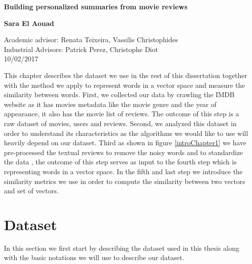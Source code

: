 \documentclass{article}
\begin{document}
\begin{titlepage}
    \begin{center}
        \vspace*{1cm}
        
        \textbf{Building personalized summaries from movie reviews}
        
        \vspace{0.5cm}
       
        \vspace{1.5cm}
        
        \textbf{Sara El Aouad}
        
        \vfill
        
       
        \vspace{0.8cm}
       
        Academic advisor: Renata Teixeira, Vassilis Christophides\\
        Industrial Advisors: Patrick Perez, Christophe Diot\\
        
        10/02/2017
        
    \end{center}
\end{titlepage}
\newpage

This chapter describes the dataset we use in the rest of this dissertation together with the method we apply to represent words in a vector space and measure the similarity between words.
First, we collected our data by crawling the IMDB website as it has movies metadata like the movie genre and the year of appearance, it also has the movie list of reviews. The outcome of this step is a raw dataset of movies, users and reviews. Second, we analyzed this dataset in order to understand its characteristics as the algorithms we would like to use will heavily depend on our dataset. Third as shown in figure \ref{introChapter1} we have pre-processed the textual reviews to remove the noisy words and to standardize the data , the outcome of this step serves as input to the fourth step which is representing words in a vector space. In the fifth and last step we introduce the similarity metrics we use in order to compute the similarity between two vectors and set of vectors.
\section{Dataset}
\label{section:dataset}
In this section we first start by describing the dataset used in this thesis along with the basic notations we will use to describe our dataset. 
\end{document}
